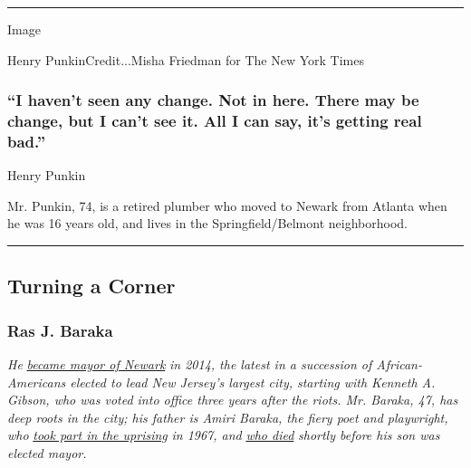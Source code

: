 \begin{center}\rule{0.5\linewidth}{\linethickness}\end{center}

Image

Henry PunkinCredit...Misha Friedman for The New York Times

\hypertarget{i-havent-seen-any-change-not-in-here-there-may-be-change-but-i-cant-see-it-all-i-can-say-its-getting-real-bad}{%
\subsubsection{``I haven't seen any change. Not in here. There may be
change, but I can't see it. All I can say, it's getting real
bad.''}\label{i-havent-seen-any-change-not-in-here-there-may-be-change-but-i-cant-see-it-all-i-can-say-its-getting-real-bad}}

Henry Punkin

Mr. Punkin, 74, is a retired plumber who moved to Newark from Atlanta
when he was 16 years old, and lives in the Springfield/Belmont
neighborhood.

\begin{center}\rule{0.5\linewidth}{\linethickness}\end{center}

\hypertarget{turning-a-corner}{%
\subsection{Turning a Corner}\label{turning-a-corner}}

\hypertarget{ras-j-baraka}{%
\subsubsection{Ras J. Baraka}\label{ras-j-baraka}}

\emph{He}
\href{https://www.nytimes3xbfgragh.onion/2014/05/14/nyregion/newark-mayoral-race.html}{\emph{became
mayor of Newark}} \emph{in 2014, the latest in a succession of
African-Americans elected to lead New Jersey's largest city, starting
with Kenneth A. Gibson, who was voted into office three years after the
riots. Mr. Baraka, 47, has deep roots in the city; his father is Amiri
Baraka, the fiery poet and playwright, who}
\href{http://www.nytimes3xbfgragh.onion/2012/10/11/nyregion/amiri-baraka-newark-poet-looks-back-on-a-bloody-week-in-1967.html}{\emph{took
part in the uprising}} \emph{in 1967, and}
\href{https://www.nytimes3xbfgragh.onion/2014/01/10/arts/amiri-baraka-polarizing-poet-and-playwright-dies-at-79.html}{\emph{who
died}} \emph{shortly before his son was elected mayor.}

